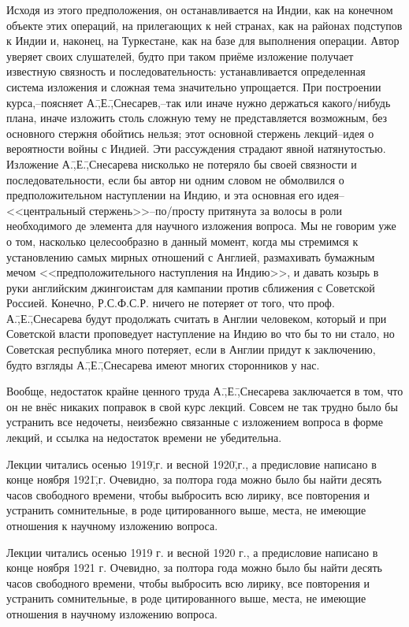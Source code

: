 Исходя из этого предположения, он останавливается на Индии, как на конечном объекте этих операций, на прилегающих к ней странах, как на районах подступов к Индии и, наконец, на Туркестане, как на базе для выполнения операции. Автор уверяет своих слушателей, будто при таком приёме изложение получает известную связность и последовательность: устанавливается определенная система изложения и сложная тема значительно упрощается. При построении курса,\---поясняет А.\=,Е.\=,Снесарев,\---так или иначе нужно держаться какого\-/нибудь плана, иначе изложить столь сложную тему не представляется возможным, без основного стержня обойтись нельзя; этот основной стержень лекций\---идея о вероятности войны с Индией. Эти рассуждения страдают явной натянутостью. Изложение А.\=,Е.\=,Снесарева нисколько не потеряло бы своей связности и последовательности, если бы автор ни одним словом не обмолвился о предположительном наступлении на Индию, и эта основная его идея\--- <<центральный стержень>>\---по\-/просту притянута за волосы в роли необходимого де элемента для научного изложения вопроса. Мы не говорим уже о том, насколько целесообразно в данный момент, когда мы стремимся к установлению самых мирных отношений с Англией, размахивать бумажным мечом <<предположительного наступления на Индию>>, и давать козырь в руки английским джингоистам для кампании против сближения с Советской Россией. Конечно, Р.С.Ф.С.Р. ничего не потеряет от того, что проф. А.\=,Е.\=,Снесарева будут продолжать считать в Англии человеком, который и при Советской власти проповедует наступление на Индию во что бы то ни стало, но Советская республика много потеряет, если в Англии придут к заключению, будто взгляды А.\=,Е.\=,Снесарева имеют многих сторонников у нас.

Вообще, недостаток крайне ценного труда А.\=,Е.\=,Снесарева заключается в том, что он не внёс никаких поправок в свой курс лекций. Совсем не так трудно было бы устранить все недочеты, неизбежно связанные с изложением вопроса в форме лекций, и ссылка на недостаток времени не убедительна.

Лекции читались осенью 1919\=,г. и весной 1920\=,г., а предисловие написано в конце ноября 1921\=,г. Очевидно, за полтора года можно было бы найти десять часов свободного времени, чтобы выбросить всю лирику, все повторения и устранить сомнительные, в роде цитированного выше, места, не имеющие отношения к научному изложению вопроса.

Лекции читались осенью 1919 г. и весной 1920 г., а предисловие написано в конце ноября 1921 г. Очевидно, за полтора года можно было бы найти десять часов свободного времени, чтобы выбросить всю лирику, все повторения и устранить сомнительные, в роде цитированного выше, места, не имеющие отношения в научному изложению вопроса.

